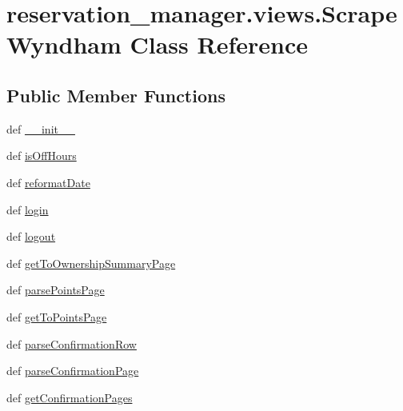 \hypertarget{classreservation__manager_1_1views_1_1ScrapeWyndham}{\section{reservation\-\_\-manager.\-views.\-Scrape\-Wyndham Class Reference}
\label{classreservation__manager_1_1views_1_1ScrapeWyndham}
}
\subsection*{Public Member Functions}
\begin{DoxyCompactItemize}
\item 
def \hyperlink{classreservation__manager_1_1views_1_1ScrapeWyndham_a8f7f70faf8b95a33554ab6ad5b2d14bb}{\-\_\-\-\_\-init\-\_\-\-\_\-}
\item 
def \hyperlink{classreservation__manager_1_1views_1_1ScrapeWyndham_ab9fea1b950281cc8199c8ce039abb5a4}{is\-Off\-Hours}
\item 
def \hyperlink{classreservation__manager_1_1views_1_1ScrapeWyndham_abd8c3dd2bad2ab05e01312138b10fcc9}{reformat\-Date}
\item 
def \hyperlink{classreservation__manager_1_1views_1_1ScrapeWyndham_ab8afb25614753b26dd24b9f3d467b7ed}{login}
\item 
def \hyperlink{classreservation__manager_1_1views_1_1ScrapeWyndham_a22759ccf5e071ab394ad2dba033c6a07}{logout}
\item 
def \hyperlink{classreservation__manager_1_1views_1_1ScrapeWyndham_a933693b80a2fe245155fdc751eabeea0}{get\-To\-Ownership\-Summary\-Page}
\item 
def \hyperlink{classreservation__manager_1_1views_1_1ScrapeWyndham_a2c3b857634800266a0fffc9b93d4e3db}{parse\-Points\-Page}
\item 
def \hyperlink{classreservation__manager_1_1views_1_1ScrapeWyndham_a2ec515f19139d7640bd548a99f6566b6}{get\-To\-Points\-Page}
\item 
def \hyperlink{classreservation__manager_1_1views_1_1ScrapeWyndham_a7712843a06596ae009dbe219d6725214}{parse\-Confirmation\-Row}
\item 
def \hyperlink{classreservation__manager_1_1views_1_1ScrapeWyndham_ae214a263f7f81c6a692c94a37bf7c818}{parse\-Confirmation\-Page}
\item 
def \hyperlink{classreservation__manager_1_1views_1_1ScrapeWyndham_a777bd0cf7eb79e7901b34697f7414d01}{get\-Confirmation\-Pages}
\end{DoxyCompactItemize}

